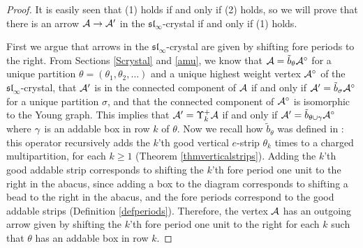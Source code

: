 \documentclass[12pt]{amsart}
\numberwithin{equation}{section}
\theoremstyle{definition}
\newcommand{\slinf}{\mathfrak{sl}_\infty}
\begin{document}
\begin{proof}
It is easily seen that (1) holds if and only if (2) holds, so we will prove that there is an arrow $\mathcal{A}\to\mathcal{A}'$ in the $\slinf$-crystal if and only if (1) holds.

First we argue that arrows in the $\slinf$-crystal are given by shifting fore periods to the right. From Sections \ref{Scrystal} and \ref{amu}, we know that $\mathcal{A}=\tilde{b}_\theta\mathcal{A}^\circ$ for a unique partition $\theta=(\theta_1,\theta_2,\dots)$ and a unique highest weight vertex $\mathcal{A}^\circ$ of the $\slinf$-crystal, that $\mathcal{A}'$ is in the connected component of $\mathcal{A}$ if and only if $\mathcal{A}'=\tilde{b}_\sigma\mathcal{A}^\circ$ for a unique partition $\sigma$, and that the connected component of $\mathcal{A}^\circ$ is isomorphic to the Young graph. This implies that $\mathcal{A}'=\Upsilon_k^+\mathcal{A}$ if and only if $\mathcal{A}'=\tilde{b}_{\theta\cup\gamma}\mathcal{A}^\circ$ where $\gamma$ is an addable box in row $k$ of $\theta$. Now we recall how $\tilde{b}_\theta$ was defined in \cite{Gerber2016a}: this operator recursively adds the $k$'th good vertical $e$-strip $\theta_k$ times to a charged multipartition, for each $k\geq 1$ (Theorem \ref{thmverticalstrips}).
Adding the $k$'th good addable strip corresponds to shifting the $k$'th fore period one unit to the right in the abacus, since adding a box to the diagram corresponds to shifting a bead to the right in the abacus, and the fore periods correspond to the good addable strips (Definition \ref{defperiods}). Therefore, the vertex $\mathcal{A}$ has an outgoing arrow given by shifting the $k$'th fore period one unit to the right for each $k$ such that $\theta$ has an addable box in row $k$. 


\end{proof}
\end{document}
